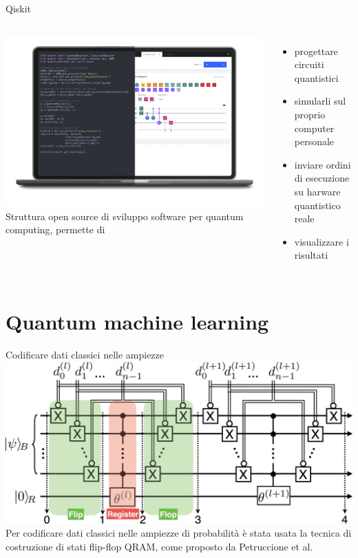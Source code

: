 \documentclass{beamer}
\begin{document}
    \begin{frame}{Qiskit}
        \begin{columns}
            \includegraphics[width=\textwidth]{gfx/laptop_strumenti.png}
            Struttura open source di sviluppo software per quantum computing, permette di 
            \begin{itemize}
                \item progettare circuiti quantistici
                \item simularli sul proprio computer personale
                \item inviare ordini di esecuzione su harware quantistico reale
                \item visualizzare i risultati
            \end{itemize}
        \end{columns}
    \end{frame}

    \section{Quantum machine learning}

    \begin{frame}{Codificare dati classici nelle ampiezze}
        \includegraphics[width=\textwidth]{gfx/qram.png}
        Per codificare dati classici nelle ampiezze di probabilità è stata usata la tecnica di costruzione 
        di stati flip-flop QRAM, come proposto da Petruccione et al. 
    \end{frame}
\end{document}
